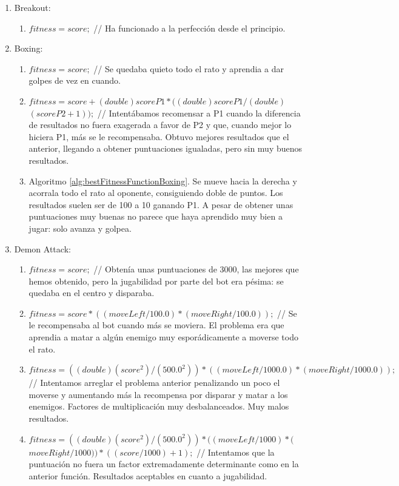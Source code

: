 \begin{enumerate}
    \item Breakout:
    \begin{enumerate}
        \item $fitness = score;$ // Ha funcionado a la perfección desde el principio.
    \end{enumerate}
    \item Boxing:
    \begin{enumerate}
        \item $fitness = score;$ // Se quedaba quieto todo el rato y aprendia a dar golpes de vez en cuando.
        \item $fitness = score + (double)scoreP1 * ((double)scoreP1 / (double)$ $(scoreP2 + 1));$ // Intentábamos recomensar a P1 cuando la diferencia de resultados no fuera exagerada a favor de P2 y que, cuando mejor lo hiciera P1, más se le recompensaba. Obtuvo mejores resultados que el anterior, llegando a obtener puntuaciones igualadas, pero sin muy buenos resultados.
        \item Algoritmo \ref{alg:bestFitnessFunctionBoxing}. Se mueve hacia la derecha y acorrala todo el rato al oponente, consiguiendo doble de puntos. Los resultados suelen ser de 100 a 10 ganando P1. A pesar de obtener unas puntuaciones muy buenas no parece que haya aprendido muy bien a jugar: solo avanza y golpea.
    \end{enumerate}
    \item Demon Attack:
    \begin{enumerate}
        \item $fitness = score;$ // Obtenía unas puntuaciones de 3000, las mejores que hemos obtenido, pero la jugabilidad por parte del bot era pésima: se quedaba en el centro y disparaba.
        \item $fitness = score * ((moveLeft / 100.0) * (moveRight / 100.0));$ // Se le recompensaba al bot cuando más se moviera. El problema era que aprendia a matar a algún enemigo muy esporádicamente a moverse todo el rato.
        \item $fitness = ((double)(score^{2}) / (500.0^{2})) * ((moveLeft / 1000.0) * (moveRight / 1000.0));$ // Intentamos arreglar el problema anterior penalizando un poco el moverse y aumentando más la recompensa por disparar y matar a los enemigos. Factores de multiplicación muy desbalanceados. Muy malos resultados.
        \item $fitness = ((double)(score^{2}) / (500.0^{2})) * ((moveLeft / 1000) * ($ $moveRight / 1000)) * ((score / 1000) + 1);$ // Intentamos que la puntuación no fuera un factor extremadamente determinante como en la anterior función. Resultados aceptables en cuanto a jugabilidad.

\end{enumerate}
\end{enumerate}
